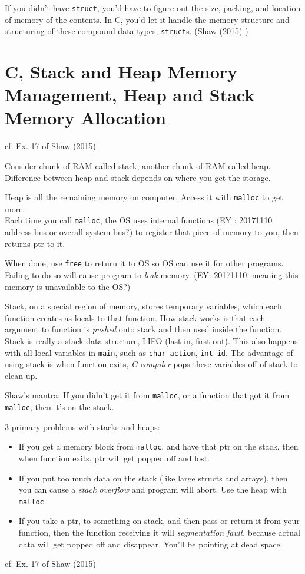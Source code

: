 \documentclass[10pt]{amsart}
\begin{document}
\begin{multicols*}{2}
If you didn't have \verb|struct|, you'd have to figure out the size, packing, and location of memory of the contents.  In C, you'd let it handle the memory structure and structuring of these compound data types, \verb|struct|s.  (Shaw (2015) \cite{Shaw2015})



\section{C, Stack and Heap Memory Management, Heap and Stack Memory Allocation}  

cf. Ex. 17 of Shaw (2015) \cite{Shaw2015}

Consider chunk of RAM called stack, another chunk of RAM called heap.  Difference between heap and stack depends on where you get the storage.  

Heap is all the remaining memory on computer.  Access it with \verb|malloc| to get more.  \\
Each time you call \verb|malloc|, the OS uses internal functions (EY : 20171110 address bus or overall system bus?) to register that piece of memory to you, then returns ptr to it.  

When done, use \verb|free| to return it to OS so OS can use it for other programs.  Failing to do so will cause program to \emph{leak} memory.  (EY: 20171110, meaning this memory is unavailable to the OS?)

Stack, on a special region of memory, stores temporary variables, which each function creates as locals to that function.  How stack works is that each argument to function is \emph{pushed} onto stack and then used inside the function.  Stack is really a stack data structure, LIFO (last in, first out).  This also happens with all local variables in \verb|main|, such as \verb|char action|, \verb|int id|.  The advantage of using stack is when function exits, \emph{C compiler} pops these variables off of stack to clean up.  

Shaw's mantra: If you didn't get it from \verb|malloc|, or a function that got it from \verb|malloc|, then it's on the stack.  

3 primary problems with stacks and heaps: 
\begin{itemize}
	\item If you get a memory block from \verb|malloc|, and have that ptr on the stack, then when function exits, ptr will get popped off and lost.  
	\item If you put too much data on the stack (like large structs and arrays), then you can cause a \emph{stack overflow} and program will abort.  Use the heap with \verb|malloc|.  
	\item If you take a ptr, to something on stack, and then pass or return it from your function, then the function receiving it will \emph{segmentation fault}, because actual data will get popped off and disappear.  You'll be pointing at dead space.  
\end{itemize}
cf. Ex. 17 of Shaw (2015) \cite{Shaw2015}



\end{multicols*}
\end{document}
